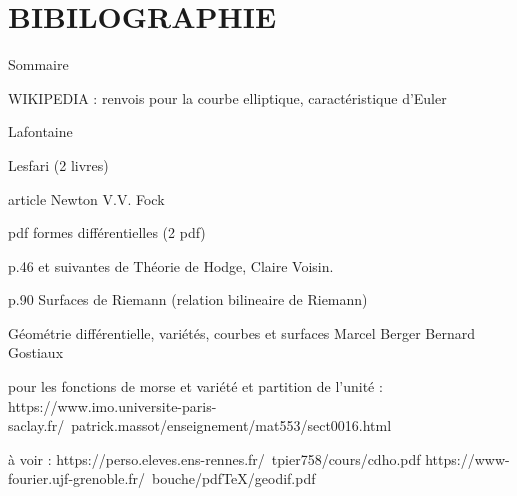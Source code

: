 \documentclass{article}
\theoremstyle{definition} %
\newcommand{\1}{\mathbb{1}} %
\begin{document}
\section{BIBILOGRAPHIE}

Sommaire

WIKIPEDIA : renvois pour la courbe elliptique, caractéristique d'Euler

Lafontaine

Lesfari (2 livres)

article Newton V.V. Fock

pdf formes différentielles (2 pdf)

p.46 et suivantes de Théorie de Hodge, Claire Voisin.

p.90 Surfaces de Riemann (relation bilineaire de Riemann)

Géométrie différentielle, variétés, courbes et surfaces Marcel Berger Bernard Gostiaux

pour les fonctions de morse et variété et partition de l'unité : https://www.imo.universite-paris-saclay.fr/~patrick.massot/enseignement/mat553/sect0016.html

à voir : https://perso.eleves.ens-rennes.fr/~tpier758/cours/cdho.pdf
https://www-fourier.ujf-grenoble.fr/~bouche/pdfTeX/geodif.pdf
\end{document}
